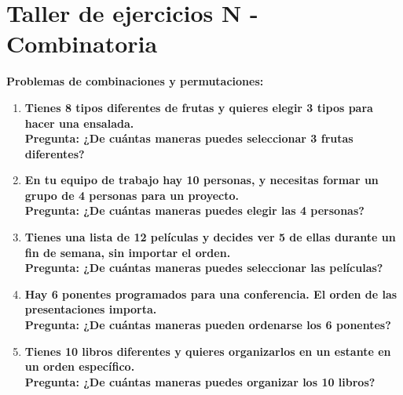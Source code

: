 \documentclass[12pt]{article}
\begin{document}
    

    \section*{\centering  Taller de ejercicios N - Combinatoria} 
    \vspace{0.5cm}\textbf{Problemas de combinaciones y permutaciones:} \vspace{0.5cm}

    \begin{enumerate}[label=\textbf{\arabic*.}]
        \item \textbf{Tienes 8 tipos diferentes de frutas y quieres elegir 3 tipos para hacer una
        ensalada.\\
        Pregunta: ¿De cuántas maneras puedes seleccionar 3 frutas diferentes?}

        \item \textbf{En tu equipo de trabajo hay 10 personas, y necesitas formar un grupo de 4
        personas para un proyecto.\\
        Pregunta: ¿De cuántas maneras puedes elegir las 4 personas?}
        
        \item \textbf{Tienes una lista de 12 películas y decides ver 5 de ellas durante un fin de
        semana, sin importar el orden.\\
        Pregunta: ¿De cuántas maneras puedes seleccionar las películas?}
        
        \item \textbf{Hay 6 ponentes programados para una conferencia. El orden de las
        presentaciones importa.\\
        Pregunta: ¿De cuántas maneras pueden ordenarse los 6 ponentes?}
        
        \item \textbf{Tienes 10 libros diferentes y quieres organizarlos en un estante en un orden
        específico.\\
        Pregunta: ¿De cuántas maneras puedes organizar los 10 libros?}
        

\end{enumerate}
\end{document}
